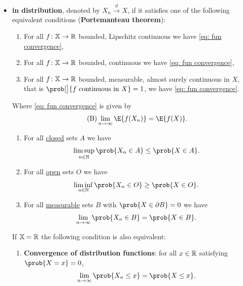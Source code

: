 \begin{mdframed}[innertopmargin=0pt]
\begin{definition}
\begin{itemize}
        \item \textbf{in distribution}, denoted by \(X_n \overset{d}\to X\), if
        it satisfies one of the following equivalent conditions (\textbf{Portemanteau theorem}):\nobreak
        \begin{enumerate}[label=(B.\arabic*),leftmargin=3em]
            \item\label{it: b.lip} For all \(f\colon \mathbb{X} \to \mathbb{R}\) bounded, Lipschitz continuous we have \eqref{eq: fun convergence},
            \item\label{it: b.cont} For all \(f\colon \mathbb{X} \to \mathbb{R}\) bounded, continuous we have \eqref{eq: fun
            convergence},
            \item\label{it: b.a.s. cont} For all \(f\colon \mathbb{X} \to \mathbb{R}\) bounded, measurable, almost surely
            continuous in \(X\), that is \(\prob[\big]{f\text{
            continuous in }X} = 1\), we have \eqref{eq:
            fun convergence}.
        \end{enumerate}
        Where \eqref{eq: fun convergence} is given by
        \begin{equation}
            \label{eq: fun convergence}\tag{B}
            \lim_{n\to\infty}\E{f(X_n)} = \E{f(X)}.
        \end{equation}
        \begin{enumerate}[label=(S.\arabic*), nosep,leftmargin=3em]
            \item\label{it: s.closed} For all \underline{closed} sets \(A\) we have
            \[\limsup_{n\in \nat} \prob{X_n \in A} \le \prob{X \in A}.\]
            \item\label{it: s.open} For all \underline{open} sets \(O\) we have 
            \[\liminf_{n\in \nat }\prob{X_n \in O} \ge \prob{X \in O}.\]
            \item\label{it: s.zero boundary} For all \underline{measurable} sets \(B\) with \underline{\(\prob{X \in \partial B} = 0\)} we have
            \[
                \lim_{n \to \infty} \prob{X_n \in B} = \prob{X \in B}.
            \]
        \end{enumerate}
        If \(\mathbb{X} = \mathbb{R}\) the following condition is also equivalent:
        \begin{enumerate}[label={(DF)},nosep,leftmargin=3em]
            \item\label{it: df} \textbf{Convergence of distribution functions}:
            for all \(x \in \mathbb{R}\) satisfying \(\prob{X = x} = 0\),
            \[
                \lim_{n \to \infty} \prob{X_n \leq x} = \prob{X \leq x}.
\]
\end{enumerate}
\end{itemize}
\end{definition}
\end{mdframed}
